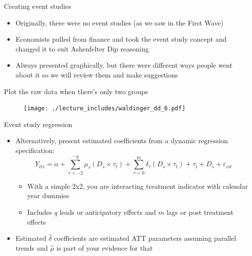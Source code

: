 \documentclass{beamer}
\begin{document}
\begin{frame}{Creating event studies}

\begin{itemize}

\item Originally, there were no event studies (as we saw in the First Wave)
\item Economists pulled from finance and took the event study concept and changed it to suit Ashenfelter Dip reasoning
\item Always presented graphically, but there were different ways people went about it so we will review them and make suggestions

\end{itemize}

\end{frame}



\begin{frame}{Plot the raw data when there's only two groups}

	\begin{figure}
	\texttt{[image: ./lecture\_includes/waldinger\_dd\_6.pdf]}
	\end{figure}

\end{frame}


\begin{frame}{Event study regression}
	
	\begin{itemize}
	\item Alternatively, present estimated coefficients from a dynamic regression specification:
 $$Y_{its} = \alpha + \sum_{\tau=-2}^{-q}\mu_{\tau} (D_s \times \tau_t) + \sum_{\tau=0}^m\delta_{\tau} (D_s \times \tau_t) + \tau_t + D_s + \varepsilon_{ist}$$
		\begin{itemize}
		\item With a simple 2x2, you are interacting treatment indicator with calendar year dummies
		\item Includes $q$ leads or anticipatory effects and $m$ lags or post treatment effects
		\end{itemize}
	\item Estimated $\widehat{\delta}$ coefficients are estimated ATT parameters assuming parallel trends and $\widehat{\mu}$ is part of your evidence for that
	\end{itemize}
\end{frame}
\end{document}
